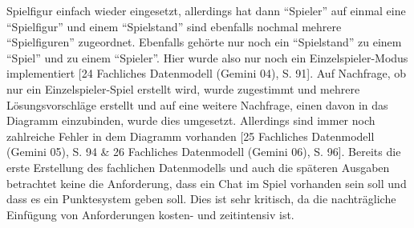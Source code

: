 Spielfigur einfach wieder eingesetzt, allerdings hat dann ``Spieler'' auf einmal eine ``Spielfigur'' und einem ``Spielstand'' sind 
ebenfalls nochmal mehrere ``Spielfiguren'' zugeordnet. Ebenfalls gehörte nur noch ein ``Spielstand'' zu einem ``Spiel'' und zu einem 
``Spieler''. Hier wurde also nur noch ein Einzelspieler-Modus implementiert [24 Fachliches Datenmodell (Gemini 04), S. 91]. Auf 
Nachfrage, ob nur ein Einzelspieler-Spiel erstellt wird, wurde zugestimmt und mehrere Lösungsvorschläge erstellt und auf eine 
weitere Nachfrage, einen davon in das Diagramm einzubinden, wurde dies umgesetzt. Allerdings sind immer noch zahlreiche Fehler 
in dem Diagramm vorhanden [25 Fachliches Datenmodell (Gemini 05), S. 94 \& 26 Fachliches Datenmodell (Gemini 06), S. 96]. Bereits 
die erste Erstellung des fachlichen Datenmodells und auch die späteren Ausgaben betrachtet keine die Anforderung, dass ein Chat 
im Spiel vorhanden sein soll und dass es ein Punktesystem geben soll. Dies ist sehr kritisch, da die nachträgliche Einfügung 
von Anforderungen kosten- und zeitintensiv ist.

